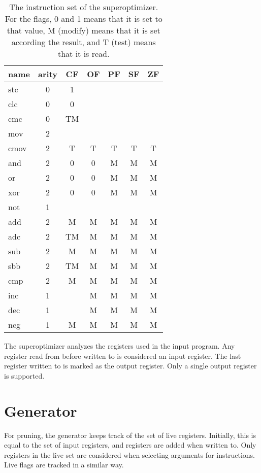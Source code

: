 \documentclass[a4paper,11pt]{kth-mag}
\begin{document}
\begin{table}
\centering
\begin{tabular}{lc|ccccc}
name & arity & CF & OF & PF & SF & ZF \\
\hline
stc  & 0     & 1  &    &    &    &    \\
clc  & 0     & 0  &    &    &    &    \\
cmc  & 0     & TM &    &    &    &    \\
mov  & 2     &    &    &    &    &    \\
cmov & 2     & T  & T  & T  & T  & T  \\
and  & 2     & 0  & 0  & M  & M  & M  \\
or   & 2     & 0  & 0  & M  & M  & M  \\
xor  & 2     & 0  & 0  & M  & M  & M  \\
not  & 1     &    &    &    &    &    \\
add  & 2     & M  & M  & M  & M  & M  \\
adc  & 2     & TM & M  & M  & M  & M  \\
sub  & 2     & M  & M  & M  & M  & M  \\
sbb  & 2     & TM & M  & M  & M  & M  \\
cmp  & 2     & M  & M  & M  & M  & M  \\
inc  & 1     &    & M  & M  & M  & M  \\
dec  & 1     &    & M  & M  & M  & M  \\
neg  & 1     & M  & M  & M  & M  & M  \\
\end{tabular}
\caption{The instruction set of the superoptimizer.
For the flags, 0 and 1 means that it is set to that value, M (modify) means that it is set according the result, and T (test) means that it is read.}
\label{tab:insns}
\end{table}

The superoptimizer analyzes the registers used in the input program.
Any register read from before written to is considered an input register.
The last register written to is marked as the output register.
Only a single output register is supported.

\section{Generator}

For pruning, the generator keeps track of the set of live registers.
Initially, this is equal to the set of input registers, and registers are added when written to.
Only registers in the live set are considered when selecting arguments for instructions.
Live flags are tracked in a similar way.
\end{document}
